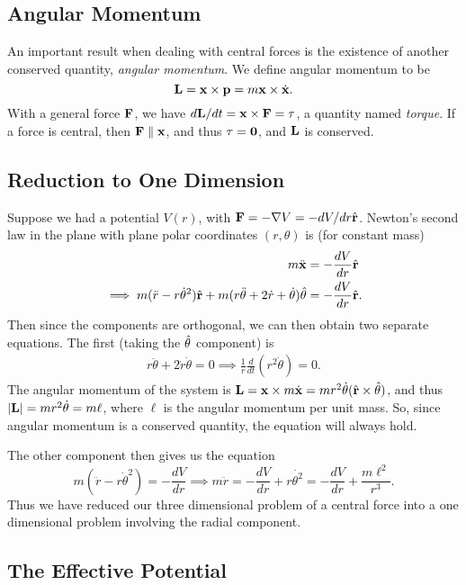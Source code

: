 \documentclass[a4paper]{scrartcl}
\newcommand{\hh}[1]{\hat{\vv{#1}}}
\begin{document}
\subsection{Angular Momentum}

An important result when dealing with central forces is the existence of another conserved quantity, \emph{angular momentum}. We define angular momentum to be
$$
\mathbf{L} = \mathbf{x} \times \mathbf{p} = m \mathbf{x} \times \dot{\mathbf{x}}.
$$
With a general force $\mathbf{F}$, we have $d \mathbf{L}/dt = \mathbf{x} \times \mathbf{F} = \mathbf{\tau}$, a quantity named \emph{torque}. If a force is central, then $\mathbf{F} \parallel \mathbf{x}$, and thus $\mathbf{\tau} = \mathbf{0}$, and $\mathbf{L}$ is conserved.

\subsection{Reduction to One Dimension}

Suppose we had a potential $V(r)$, with $\vv F = - \nabla V = - dV/dr \hh r$. Newton's second law in the plane with plane polar coordinates $(r, \theta)$ is (for constant mass)
\begin{align*}
	m \ddot{\vv x} &= - \frac{dV}{dr} \hh r \\
\implies m (\ddot{r} - r \dot{\theta}^2) \hh r + m (r \ddot{\theta} + 2 \dot{r} + \dot{\theta}) \hh \theta &= -\frac{dV}{dr} \hh r.
\end{align*}
Then since the components are orthogonal, we can then obtain two separate equations. The first (taking the $\hh \theta$ component) is
\begin{align*}
	r \ddot{\theta} + 2 \dot{r} \dot{\theta} = 0 \implies \frac{1}{r} \frac{d}{dt}(r^2 \dot{\theta}) = 0.
\end{align*}
The angular momentum of the system is $\vv L = \vv x \times m \dot{\vv x} = m r^2 \dot{\theta} (\hh r \times \hh \theta)$, and thus $|\mathbf{L}| = m r^2 \dot{\theta} = m \ell$, where $\ell$ is the angular momentum per unit mass. So, since angular momentum is a conserved quantity, the equation will always hold.

The other component then gives us the equation
$$
m(\ddot{r} - r \dot{\theta}^2) = - \frac{dV}{dr} \implies m \ddot{r} = -\frac{dV}{dr} + r \dot{\theta^2} = - \frac{dV}{dr} + \frac{m\ell^2}{r^3}.
$$
Thus we have reduced our three dimensional problem of a central force into a one dimensional problem involving the radial component. 

\subsection{The Effective Potential}
\end{document}
